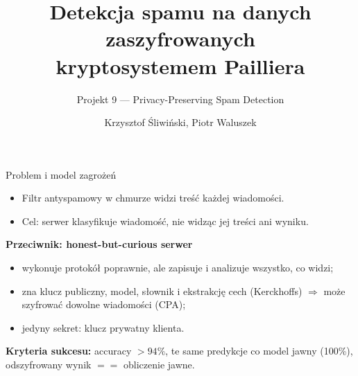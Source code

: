 \documentclass[aspectratio=169,11pt]{beamer}
\title{Detekcja spamu na danych zaszyfrowanych\\kryptosystemem Pailliera}
\subtitle{Projekt 9 --- Privacy-Preserving Spam Detection}
\author{Krzysztof Śliwiński, Piotr Waluszek}
\institute{Politechnika Krakowska, Wydział Informatyki i Telekomunikacji}
\date{}
\begin{document}
\begin{frame}
  \titlepage
\end{frame}

\begin{frame}{Problem i model zagrożeń}
  \begin{itemize}
    \item Filtr antyspamowy w chmurze widzi treść każdej wiadomości.
    \item Cel: serwer klasyfikuje wiadomość, \alert{nie widząc jej treści ani wyniku}.
  \end{itemize}
  \vspace{0.5em}
  \textbf{Przeciwnik: honest-but-curious serwer}
  \begin{itemize}
    \item wykonuje protokół poprawnie, ale zapisuje i analizuje wszystko, co widzi;
    \item zna klucz publiczny, model, słownik i ekstrakcję cech (Kerckhoffs) $\Rightarrow$ może szyfrować dowolne wiadomości (\alert{CPA});
    \item jedyny sekret: klucz prywatny klienta.
  \end{itemize}
  \vspace{0.5em}
  \textbf{Kryteria sukcesu:} accuracy $> 94\%$, te same predykcje co model jawny (100\%), odszyfrowany wynik $==$ obliczenie jawne.
\end{frame}
\end{document}
